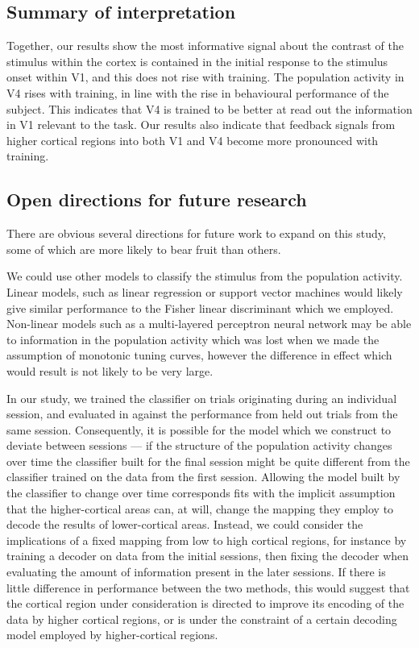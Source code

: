 \subsection{Summary of interpretation}

Together, our results show the most informative signal about the contrast of the stimulus within the cortex is contained in the initial response to the stimulus onset within \ac{V1}, and this does not rise with training.
The population activity in \ac{V4} rises with training, in line with the rise in behavioural performance of the subject.
This indicates that \ac{V4} is trained to be better at read out the information in \ac{V1} relevant to the task.
Our results also indicate that feedback signals from higher cortical regions into both \ac{V1} and \ac{V4} become more pronounced with training.


\subsection{Open directions for future research}

There are obvious several directions for future work to expand on this study, some of which are more likely to bear fruit than others.

We could use other models to classify the stimulus from the population activity.
Linear models, such as linear regression or support vector machines would likely give similar performance to the Fisher linear discriminant which we employed.
Non-linear models such as a multi-layered perceptron neural network may be able to information in the population activity which was lost when we made the assumption of monotonic tuning curves, however the difference in effect which would result is not likely to be very large.

In our study, we trained the classifier on trials originating during an individual session, and evaluated in against the performance from held out trials from the same session.
Consequently, it is possible for the model which we construct to deviate between sessions --- if the structure of the population activity changes over time the classifier built for the final session might be quite different from the classifier trained on the data from the first session.
Allowing the model built by the classifier to change over time corresponds fits with the implicit assumption that the higher-cortical areas can, at will, change the mapping they employ to decode the results of lower-cortical areas.
Instead, we could consider the implications of a fixed mapping from low to high cortical regions, for instance by training a decoder on data from the initial sessions, then fixing the decoder when evaluating the amount of information present in the later sessions.
If there is little difference in performance between the two methods, this would suggest that the cortical region under consideration is directed to improve its encoding of the data by higher cortical regions, or is under the constraint of a certain decoding model employed by higher-cortical regions.

